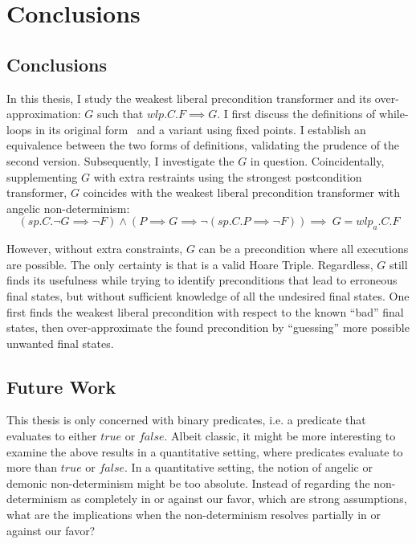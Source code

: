 \chapter{Conclusions}\label{ch:conclusion} %

\section{Conclusions}
In this thesis, I study the weakest liberal precondition transformer and its over-approximation: $G$ such that $wlp.C.F\implies G$. 
I first discuss the definitions of while-loops in its original form~\cite{dijkstra75} and a variant using fixed points. 
I establish an equivalence between the two forms of definitions, validating the prudence of the second version. 
Subsequently, I investigate the $G$ in question. 
Coincidentally, supplementing $G$ with extra restraints using the strongest postcondition transformer, $G$ coincides with the weakest liberal precondition transformer with angelic non-determinism: 
$$(sp.C.\neg G {\implies} \neg F) \wedge
(P{\implies} G \implies \neg(sp.C.P {\implies} \neg F) )
\implies\ G = wlp_a.C.F$$

However, without extra constraints, $G$ can be a precondition where all executions are possible. 
The only certainty is that  is a valid Hoare Triple. 
Regardless, $G$ still finds its usefulness while trying to identify preconditions that lead to erroneous final states, but without sufficient knowledge of all the undesired final states. 
One first finds the weakest liberal precondition with respect to the known ``bad'' final states, then over-approximate the found precondition by ``guessing'' more possible unwanted final states. 

\section{Future Work}
This thesis is only concerned with binary predicates, i.e. a predicate that evaluates to either $true$ or $false$. 
Albeit classic, it might be more interesting to examine the above results in a quantitative setting, where predicates evaluate to more than $true$ or $false$. 
In a quantitative setting, the notion of angelic or demonic non-determinism might be too absolute. 
Instead of regarding the non-determinism as completely in or against our favor, which are strong assumptions, what are the implications when the non-determinism resolves partially in or against our favor? 



